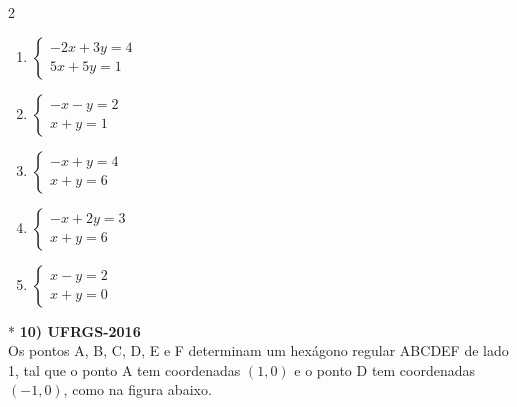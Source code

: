 \documentclass[11pt,a4paper]{article}
\begin{document}
\begin{paracol}{2}
    \vspace{0.3cm}
    \begin{enumerate}[label=(\Alph*), itemsep=0.4cm]
        \item $\begin{cases} -2x + 3y = 4 \\ 5x + 5y = 1 \end{cases}$
        \item $\begin{cases} -x - y = 2 \\ x + y = 1 \end{cases}$
        \item $\begin{cases} -x + y = 4 \\ x + y = 6 \end{cases}$
        \item $\begin{cases} -x + 2y = 3 \\ x + y = 6 \end{cases}$
        \item $\begin{cases} x - y = 2 \\ x + y = 0 \end{cases}$
    \end{enumerate}
    \vspace{0.4cm}

    \switchcolumn[1]
    \vspace{12cm}

    \switchcolumn[0]*
    \newpage
    \textbf{10) UFRGS-2016} \\
    Os pontos A, B, C, D, E e F determinam um hexágono regular ABCDEF de lado 1, tal que o ponto A tem coordenadas $(1,0)$ e o ponto D tem coordenadas $(-1,0)$, como na figura abaixo.

    \vspace{0.2cm}
    \begin{center}
\end{center}
\end{paracol}
\end{document}
